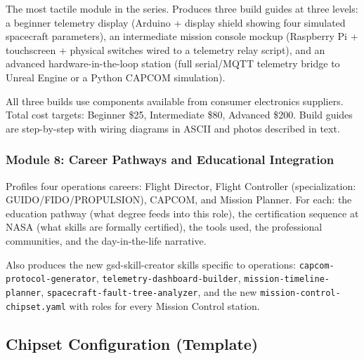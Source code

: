 \documentclass[11pt,letterpaper]{article}
\begin{document}
The most tactile module in the series. Produces three build guides at three levels: a beginner telemetry display (Arduino + display shield showing four simulated spacecraft parameters), an intermediate mission console mockup (Raspberry Pi + touchscreen + physical switches wired to a telemetry relay script), and an advanced hardware-in-the-loop station (full serial/MQTT telemetry bridge to Unreal Engine or a Python CAPCOM simulation).

All three builds use components available from consumer electronics suppliers. Total cost targets: Beginner \$25, Intermediate \$80, Advanced \$200. Build guides are step-by-step with wiring diagrams in ASCII and photos described in text.

\subsubsection{Module 8: Career Pathways and Educational Integration}

Profiles four operations careers: Flight Director, Flight Controller (specialization: GUIDO/FIDO/PROPULSION), CAPCOM, and Mission Planner. For each: the education pathway (what degree feeds into this role), the certification sequence at NASA (what skills are formally certified), the tools used, the professional communities, and the day-in-the-life narrative.

Also produces the new gsd-skill-creator skills specific to operations: \texttt{capcom-protocol-generator}, \texttt{telemetry-dashboard-builder}, \texttt{mission-timeline-planner}, \texttt{spacecraft-fault-tree-analyzer}, and the new \texttt{mission-control-chipset.yaml} with roles for every Mission Control station.

\subsection{Chipset Configuration (Template)}
\end{document}
